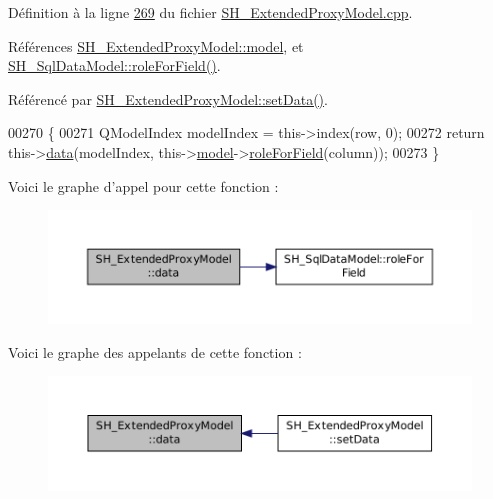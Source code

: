 Définition à la ligne \hyperlink{SH__ExtendedProxyModel_8cpp_source_l00269}{269} du fichier \hyperlink{SH__ExtendedProxyModel_8cpp_source}{S\-H\-\_\-\-Extended\-Proxy\-Model.\-cpp}.



Références \hyperlink{classSH__ExtendedProxyModel_a8c8b8930c6b1abd9bbb1dce1fdc9690b}{S\-H\-\_\-\-Extended\-Proxy\-Model\-::model}, et \hyperlink{classSH__SqlDataModel_a0e05155c3c22c6fef7b91ec57d383ae5}{S\-H\-\_\-\-Sql\-Data\-Model\-::role\-For\-Field()}.



Référencé par \hyperlink{classSH__ExtendedProxyModel_af92835fcefa1917f9cab64307f6b95b8}{S\-H\-\_\-\-Extended\-Proxy\-Model\-::set\-Data()}.


\begin{DoxyCode}
00270 \{
00271     QModelIndex modelIndex = this->index(row, 0);
00272     \textcolor{keywordflow}{return} this->\hyperlink{classSH__ExtendedProxyModel_aca6cc510f740e847e0cfc06e0adb5771}{data}(modelIndex, this->\hyperlink{classSH__ExtendedProxyModel_a8c8b8930c6b1abd9bbb1dce1fdc9690b}{model}->\hyperlink{classSH__SqlDataModel_a0e05155c3c22c6fef7b91ec57d383ae5}{roleForField}(column));
00273 \}
\end{DoxyCode}


Voici le graphe d'appel pour cette fonction \-:
\nopagebreak
\begin{figure}[H]
\begin{center}
\leavevmode
\includegraphics[width=350pt]{classSH__ExtendedProxyModel_aca6cc510f740e847e0cfc06e0adb5771_cgraph}
\end{center}
\end{figure}




Voici le graphe des appelants de cette fonction \-:
\nopagebreak
\begin{figure}[H]
\begin{center}
\leavevmode
\includegraphics[width=350pt]{classSH__ExtendedProxyModel_aca6cc510f740e847e0cfc06e0adb5771_icgraph}
\end{center}
\end{figure}


